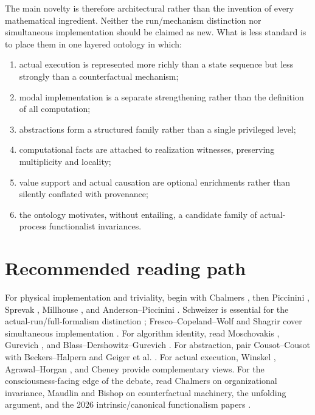 \documentclass[11pt,a4paper]{article}
\begin{document}
The main novelty is therefore architectural rather than the invention of every mathematical ingredient. Neither the run/mechanism distinction nor simultaneous implementation should be claimed as new. What is less standard is to place them in one layered ontology in which:

\begin{enumerate}
  \item actual execution is represented more richly than a state sequence but less strongly than a counterfactual mechanism;
  \item modal implementation is a separate strengthening rather than the definition of all computation;
  \item abstractions form a structured family rather than a single privileged level;
  \item computational facts are attached to realization witnesses, preserving multiplicity and locality;
  \item value support and actual causation are optional enrichments rather than silently conflated with provenance;
  \item the ontology motivates, without entailing, a candidate family of actual-process functionalist invariances.
\end{enumerate}

\section{Recommended reading path}

For physical implementation and triviality, begin with Chalmers \cite{Chalmers1994,Chalmers1996}, then Piccinini \cite{Piccinini2015}, Sprevak \cite{Sprevak2018}, Millhouse \cite{Millhouse2019}, and Anderson--Piccinini \cite{AndersonPiccinini2024}. Schweizer is essential for the actual-run/full-formalism distinction \cite{Schweizer2019}; Fresco--Copeland--Wolf and Shagrir cover simultaneous implementation \cite{Fresco2021,Shagrir2022}. For algorithm identity, read Moschovakis \cite{Moschovakis2001}, Gurevich \cite{Gurevich2000}, and Blass--Dershowitz--Gurevich \cite{Blass2009}. For abstraction, pair Cousot--Cousot \cite{Cousot1977} with Beckers--Halpern \cite{BeckersHalpern2019} and Geiger et al. \cite{Geiger2025}. For actual execution, Winskel \cite{Winskel1987}, Agrawal--Horgan \cite{AgrawalHorgan1990}, and Cheney \cite{Cheney2010} provide complementary views. For the consciousness-facing edge of the debate, read Chalmers on organizational invariance, Maudlin and Bishop on counterfactual machinery, the unfolding argument, and the 2026 intrinsic/canonical functionalism papers \cite{Maudlin1989,Bishop2002,Doerig2019,MaKanai2026,KanaiMaCanonical2026,KanaiMaICCR2026}.
\end{document}
